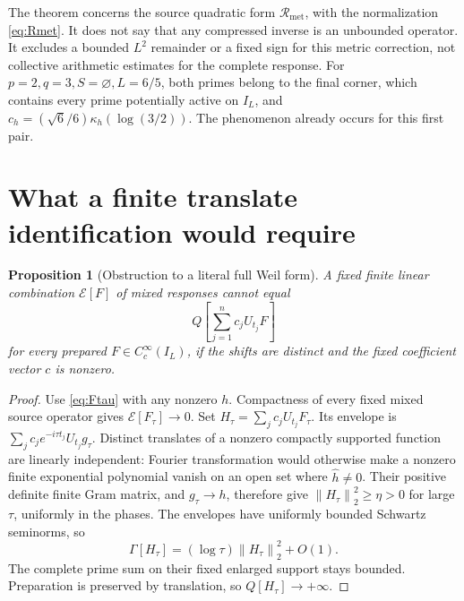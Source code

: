 \documentclass[11pt]{article}
\newtheorem{proposition}[theorem]{Proposition}
\theoremstyle{remark}
\newcommand{\Rmet}{\mathcal R_{\mathrm{met}}}
\newcommand{\norm}[1]{\left\lVert#1\right\rVert}
\numberwithin{equation}{section}
\begin{document}
The theorem concerns the source quadratic form \(\Rmet\), with the
normalization \eqref{eq:Rmet}. It does not say that any compressed inverse
is an unbounded operator. It excludes a bounded \(L^2\) remainder or a
fixed sign for this metric correction, not collective arithmetic estimates
for the complete response. For \(p=2,q=3,S=\varnothing,L=6/5\), both
primes belong to the final corner, which contains every prime potentially
active on \(I_L\), and \(c_h=(\sqrt6/6)\kappa_h(\log(3/2))\). The phenomenon already occurs
for this first pair.

\section{What a finite translate identification would require}\label{sec:translate}

\begin{proposition}[Obstruction to a literal full Weil form]\label{prop:translate}
A fixed finite linear combination \(\mathcal E[F]\) of mixed responses
cannot equal
\[
 Q\left[\sum_{j=1}^n c_jU_{t_j}F\right]
\]
for every prepared \(F\in C_c^\infty(I_L)\), if the shifts are distinct
and the fixed coefficient vector \(c\) is nonzero.
\end{proposition}
\begin{proof}
Use \eqref{eq:Ftau} with any nonzero \(h\). Compactness of every fixed
mixed source operator gives \(\mathcal E[F_\tau]\to0\).
Set \(H_\tau=\sum_jc_jU_{t_j}F_\tau\). Its envelope is
\(\sum_jc_je^{-i\tau t_j}U_{t_j}g_\tau\).
Distinct translates of a nonzero compactly supported function are
linearly independent: Fourier transformation would otherwise make a
nonzero finite exponential polynomial vanish on an open set where
\(\widehat h\ne0\). Their positive definite finite Gram matrix, and
\(g_\tau\to h\), therefore give \(\norm{H_\tau}_2^2\ge\eta>0\) for
large \(\tau\), uniformly in the phases. The envelopes have uniformly
bounded Schwartz seminorms, so
\[
 \Gamma[H_\tau]=(\log\tau)\norm{H_\tau}_2^2+O(1).
\]
The complete prime sum on their fixed enlarged support stays bounded.
Preparation is preserved by translation, so \(Q[H_\tau]\to+\infty\).
\end{proof}
\end{document}
